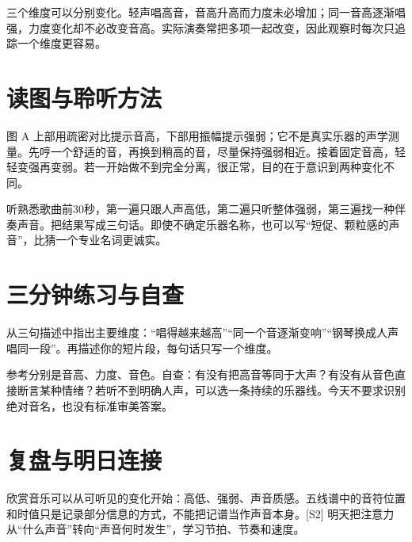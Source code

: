 \documentclass[11pt]{article}
\newcommand{\Needspace}[1]{\par\ifdim\dimexpr\pagegoal-\pagetotal\relax<#1\relax\newpage\fi}
\begin{document}
三个维度可以分别变化。轻声唱高音，音高升高而力度未必增加；同一音高逐渐唱强，力度变化却不必改变音高。实际演奏常把多项一起改变，因此观察时每次只追踪一个维度更容易。

\Needspace{5\baselineskip}\section*{读图与聆听方法}

图 A 上部用疏密对比提示音高，下部用振幅提示强弱；它不是真实乐器的声学测量。先哼一个舒适的音，再换到稍高的音，尽量保持强弱相近。接着固定音高，轻轻变强再变弱。若一开始做不到完全分离，很正常，目的在于意识到两种变化不同。

听熟悉歌曲前30秒，第一遍只跟人声高低，第二遍只听整体强弱，第三遍找一种伴奏声音。把结果写成三句话。即使不确定乐器名称，也可以写“短促、颗粒感的声音”，比猜一个专业名词更诚实。

\Needspace{5\baselineskip}\section*{三分钟练习与自查}

从三句描述中指出主要维度：“唱得越来越高”“同一个音逐渐变响”“钢琴换成人声唱同一段”。再描述你的短片段，每句话只写一个维度。

参考分别是音高、力度、音色。自查：有没有把高音等同于大声？有没有从音色直接断言某种情绪？若听不到明确人声，可以选一条持续的乐器线。今天不要求识别绝对音名，也没有标准审美答案。

\Needspace{5\baselineskip}\section*{复盘与明日连接}

欣赏音乐可以从可听见的变化开始：高低、强弱、声音质感。五线谱中的音符位置和时值只是记录部分信息的方式，不能把记谱当作声音本身。[S2] 明天把注意力从“什么声音”转向“声音何时发生”，学习节拍、节奏和速度。
\end{document}
